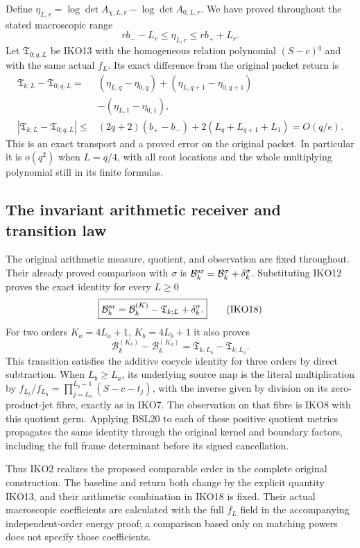 Define $\eta_{L,r}=\log\det A_{\chi,L,r}-\log\det A_{0,L,r}$.
We have proved throughout the stated macroscopic range
\[
 rb_- -L_r\leq\eta_{L,r}\leq rb_++L_r.
 \tag{IKO16}
\]
Let $\mathfrak T_{0;q,L}$ be IKO13 with the homogeneous relation
polynomial $(S-c)^q$ and with the same actual $f_L$. Its exact
difference from the original packet return is
\[
 \begin{split}
 \mathfrak T_{k;L}-\mathfrak T_{0;q,L}
   ={}& (\eta_{L,q}-\eta_{0,q})
       +(\eta_{L,q+1}-\eta_{0,q+1})\\
      &-(\eta_{L,1}-\eta_{0,1}),\\
 |\mathfrak T_{k;L}-\mathfrak T_{0;q,L}|
   \leq{}&(2q+2)(b_+-b_-)+2(L_q+L_{q+1}+L_1)
         =O(q/e).
 \end{split}
 \tag{IKO17}
\]
This is an exact transport and a proved error on the original packet.
In particular it is $o(q^2)$ when $L=q/4$, with all root locations
and the whole multiplying polynomial still in its finite formulas.

\subsection{The invariant arithmetic receiver and transition law}
The original arithmetic measure, quotient, and observation are fixed
throughout. Their already proved comparison with $\sigma$ is
$\mathcal B_k^{\rm ar}=\mathcal B_k^\sigma+\delta_k^\sigma$.
Substituting IKO12 proves the exact identity for every $L\geq0$
\[
 \boxed{\mathcal B_k^{\rm ar}
      =\mathcal B_k^{(K)}-\mathfrak T_{k;L}+\delta_k^\sigma.}
 \tag{IKO18}
\]
For two orders $K_a=4L_a+1$, $K_b=4L_b+1$ it also proves
\[
 \mathcal B_k^{(K_b)}-\mathcal B_k^{(K_a)}
       =\mathfrak T_{k;L_b}-\mathfrak T_{k;L_a}.
 \tag{IKO19}
\]
This transition satisfies the additive cocycle identity for three
orders by direct subtraction. When $L_b\geq L_a$, its underlying
source map is the literal multiplication by
$f_{L_b}/f_{L_a}=\prod_{j=L_a}^{L_b-1}(S-c-t_j)$, with the inverse
given by division on its zero-product-jet fibre, exactly as in IKO7.
The observation on that fibre is IKO8 with this quotient germ.
Applying BSL20 to each of these positive quotient metrics propagates
the same identity through the original kernel and boundary factors,
including the full frame determinant before its signed cancellation.

Thus IKO2 realizes the proposed comparable order in the complete
original construction. The baseline and return both change by the
explicit quantity IKO13, and their arithmetic combination in IKO18
is fixed. Their actual macroscopic coefficients are calculated with
the full $f_L$ field in the accompanying independent-order energy
proof; a comparison based only on matching powers does not specify
those coefficients.
